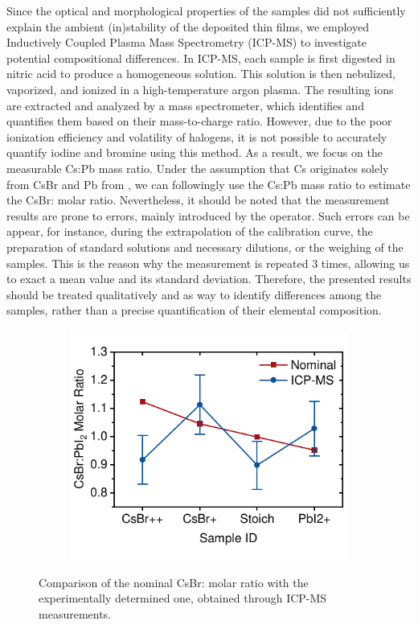 Since the optical and morphological properties of the samples did not sufficiently explain the ambient (in)stability of the deposited thin films, we employed Inductively Coupled Plasma Mass Spectrometry (ICP-MS) to investigate potential compositional differences. In ICP-MS, each sample is first digested in nitric acid to produce a homogeneous solution. This solution is then nebulized, vaporized, and ionized in a high-temperature argon plasma. The resulting ions are extracted and analyzed by a mass spectrometer, which identifies and quantifies them based on their mass-to-charge ratio. However, due to the poor ionization efficiency and volatility of halogens, it is not possible to accurately quantify iodine and bromine using this method. As a result, we focus on the measurable Cs:Pb mass ratio. Under the assumption that Cs originates solely from CsBr and Pb from , we can followingly use the Cs:Pb mass ratio to estimate the CsBr: molar ratio. Nevertheless, it should be noted that the measurement results are prone to errors, mainly introduced by the operator. Such errors can be appear, for instance, during the extrapolation of the calibration curve, the preparation of standard solutions and necessary dilutions, or the weighing of the samples. This is the reason why the measurement is repeated 3 times, allowing us to exact a mean value and its standard deviation. Therefore, the presented results should be treated qualitatively and as way to identify differences among the samples, rather than a precise quantification of their elemental composition. 

\begin{figure}[htbp]
    \centering
    \begin{subfigure}[t]{0.65\textwidth}
        \centering
        \includegraphics[width=\textwidth]{chapters/stability/imeges/Stability-ICP-MS.pdf} %
    \end{subfigure}

    \caption{Comparison of the nominal CsBr: molar ratio with the experimentally determined one, obtained through ICP-MS measurements.}
    \label{fig:stability:icp_ms}
\end{figure}

